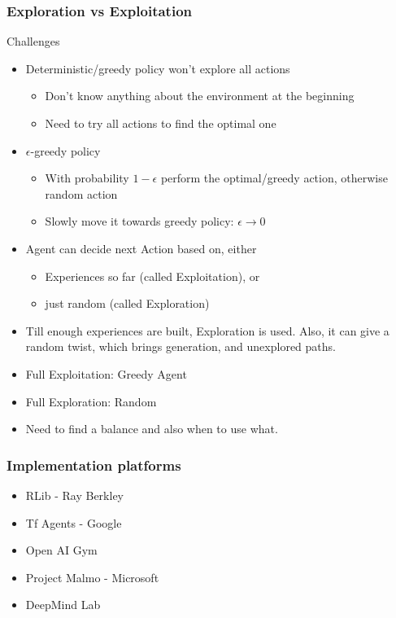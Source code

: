 \begin{frame}[fragile]\frametitle{Exploration vs Exploitation}

Challenges

\begin{itemize}
\item Deterministic/greedy policy won’t explore all actions
	\begin{itemize}
	\item Don’t know anything about the environment at the beginning
	\item Need to try all actions to find the optimal one
	\end{itemize}

\item $\epsilon$-greedy policy
	\begin{itemize}
	\item	With probability $1-\epsilon$ perform the optimal/greedy action, otherwise random action
	\item	Slowly move it towards greedy policy: $\epsilon \rightarrow 0$
	\end{itemize}
\item Agent can decide next Action based on, either
	\begin{itemize}
	\item Experiences so far (called Exploitation), or
	\item just random (called Exploration)
	\end{itemize}
\item Till enough experiences are built, Exploration is used. Also, it can give a random twist, which brings generation, and unexplored paths.
\item Full Exploitation: Greedy Agent
\item Full Exploration: Random
\item Need to find a balance and also when to use what.
\end{itemize}
\end{frame}


\begin{frame}[fragile]\frametitle{Implementation platforms}

\begin{itemize}
\item RLib - Ray Berkley
\item Tf Agents - Google
\item Open AI Gym
\item Project Malmo - Microsoft
\item DeepMind Lab
\end{itemize}

\end{frame}

